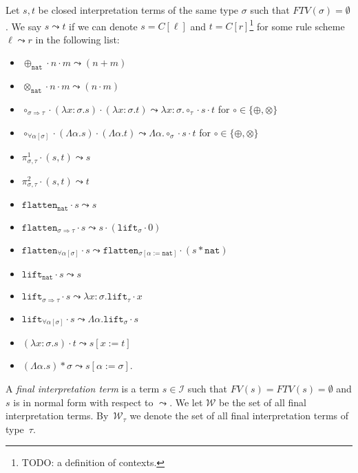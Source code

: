 \documentclass[runningheads,a4paper]{llncs}
\newcommand{\Iterms}{\mathcal{I}}
\newcommand{\World}{\mathcal{W}}
\newcommand{\quant}[2]{\forall #1[#2]}
\newcommand{\arrtype}{\Rightarrow}
\newcommand{\abs}[2]{\lambda #1.#2}
\newcommand{\tabs}[2]{\Lambda #1.#2}
\newcommand{\app}[2]{#1 \cdot #2}
\newcommand{\tapp}[2]{#1 * #2}
\newcommand{\subst}[2]{#1:=#2}
\newcommand{\FTV}{\mathit{FTV}}
\newcommand{\FV}{\mathit{FV}}
\newcommand{\nat}{\mathtt{nat}}
\newcommand{\proj}{\pi}
\newcommand{\flatten}{\mathtt{flatten}}
\newcommand{\lift}{\mathtt{lift}}
\begin{document}
\begin{definition}
Let $s,t$ be closed interpretation terms of the same type $\sigma$ such
that $\FTV(\sigma) = \emptyset$.  We say $s \leadsto t$ if we can denote
$s = C[\ell]$ and $t = C[r]$\footnote{TODO: a definition of contexts.}
for some rule scheme $\ell \leadsto r$ in the following list:
\begin{itemize}
\item $\app{\app{\oplus_{\nat}}{n}}{m} \leadsto (n+m)$ 
\item $\app{\app{\otimes_{\nat}}{n}}{m} \leadsto (n \cdot m)$ 
\item $\app{\app{\circ_{\sigma \arrtype \tau}}{(\abs{x:\sigma}{s})}}{
  (\abs{x:\sigma}{t})} \leadsto \abs{x:\sigma}{\app{\app{\circ_\tau}{
  s}}{t}}$ for $\circ \in \{ \oplus, \otimes \}$
\item $\app{\app{\circ_{\quant{\alpha}{\sigma}}}{(\tabs{\alpha}{s})}}{
    (\tabs{\alpha}{t})} \leadsto \tabs{\alpha}{\app{\app{\circ_\sigma}{s}}{t}}$
  for $\circ \in \{ \oplus, \otimes \}$
\item $\app{\proj^1_{\sigma,\tau}}{(s,t)} \leadsto s$
\item $\app{\proj^2_{\sigma,\tau}}{(s,t)} \leadsto t$
\item $\app{\flatten_\nat}{s} \leadsto s$
\item $\app{\flatten_{\sigma \arrtype \tau}}{s} \leadsto
  \app{s}{(\app{\lift_\sigma}{0})}$
\item $\app{\flatten_{\quant{\alpha}{\sigma}}}{s} \leadsto
  \app{\flatten_{\sigma[\subst{\alpha}{\nat}]}}{(\tapp{s}{\nat})}$
\item $\app{\lift_\nat}{s} \leadsto s$
\item $\app{\lift_{\sigma \arrtype \tau}}{s} \leadsto
  \abs{x:\sigma}{\app{\lift_{\tau}}{x}}$
\item $\app{\lift_{\quant{\alpha}{\sigma}}}{s} \leadsto
  \tabs{\alpha}{\app{\lift_{\sigma}}{s}}$
\item $\app{(\abs{x:\sigma}{s})}{t} \leadsto s[\subst{x}{t}]$
\item $\tapp{(\tabs{\alpha}{s})}{\sigma} \leadsto
  s[\subst{\alpha}{\sigma}]$.
\end{itemize}
A \emph{final interpretation term} is a term $s \in \Iterms$ such that
$\FV(s) = \FTV(s) = \emptyset$ and $s$ is in normal form with respect
to $\leadsto$.  We let $\World$ be the set of all final interpretation
terms. By~$\World_\tau$ we denote the set of all final interpretation
terms of type~$\tau$.
\end{definition}
\end{document}
